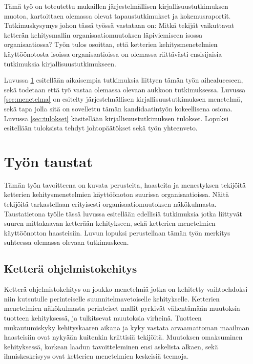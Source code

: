 Tämä työ on toteutettu mukaillen järjestelmällisen kirjallisuustutkimuksen
muotoa, kartoittaen olemassa olevat tapaustutkimukset ja kokemusraportit.
Tutkimuskysymys johon tässä työssä vastataan on: Mitkä tekijät vaikuttavat
ketterän kehitysmallin organisaatiomuutoksen läpiviemiseen isossa
organisaatiossa? Työn tulos osoittaa, että ketterien kehitysmenetelmien
käyttöönotosta isoissa organisaatioissa on olemassa riittävästi ensisijaisia
tutkimuksia kirjallisuustutkimukseen.

Luvussa \ref{sec:tausta} esitellään aikaisempia tutkimuksia liittyen tämän työn
aihealueeseen, sekä todetaan että työ vastaa olemassa olevaan aukkoon
tutkimuksessa. Luvussa \ref{sec:menetelma} on esitelty järjestelmällisen
kirjallisuustutkimuksen menetelmä, sekä tapa jolla sitä on sovellettu tämän
kandidaatintyön kokeellisena osiona. Luvussa \ref{sec:tulokset} käsitellään
kirjallisuustutkimuksen tulokset. Lopuksi esitellään tuloksista tehdyt
johtopäätökset sekä työn yhteenveto.



\section{Työn taustat}
\label{sec:tausta}

Tämän työn tavoitteena on kuvata perusteita, haasteita ja menestyksen tekijöitä
ketterien kehitysmenetelmien käyttöönoton suurissa organisaatioissa. Näitä
tekijöitä tarkastellaan erityisesti organisaatiomuutoksen näkökulmasta.
Taustatietona työlle tässä luvussa esitellään edellisiä tutkimuksia jotka
liittyvät suuren mittakaavan ketterään kehitykseen, sekä ketterien menetelmien
käyttöönotton haasteisiin.
Luvun lopuksi perustellaan tämän työn merkitys suhteessa olemassa olevaan
tutkimuskeen.

\subsection{Ketterä ohjelmistokehitys}

Ketterä ohjelmistokehitys on joukko menetelmiä jotka on kehitetty vaihtoehdoksi
niin kutsutulle perinteiselle suunnitelmavetoiselle kehitykselle. Ketterien
menetelmien näkökulmasta perinteiset mallit pyrkivät vähentämään muutoksia
tuotteen kehityksessä, ja tulkitsevat muutoksia virheinä. Tuotteen
mukautumiskyky kehityskaaren aikana ja kyky vastata arvaamattoman maailman
haasteisiin ovat nykyään kuitenkin kriittisiä tekijöitä. Muutoksen omaksuminen
kehityksessä, korkean laadun tavoitteleminen ensi askelista alkaen, sekä
ihmiskeskeisyys ovat ketterien menetelmien keskeisiä teemoja.

